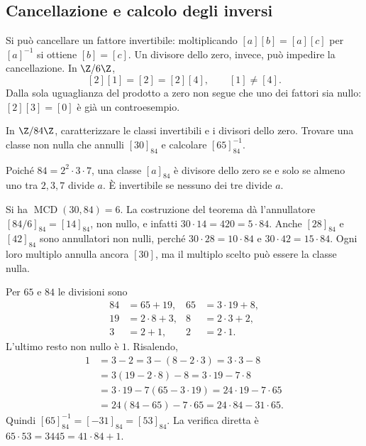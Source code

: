 \subsection{Cancellazione e calcolo degli inversi}
\begin{osservazione}
Si può cancellare un fattore invertibile: moltiplicando $[a][b]=[a][c]$ per $[a]^{-1}$ si ottiene $[b]=[c]$. Un divisore dello zero, invece, può impedire la cancellazione. In $\Z/6\Z$,
\[
[2][1]=[2]=[2][4],\qquad [1]\ne[4].
\]
Dalla sola uguaglianza del prodotto a zero non segue che uno dei fattori sia nullo: $[2][3]=[0]$ è già un controesempio.
\end{osservazione}

\begin{esercizio}
In $\Z/84\Z$, caratterizzare le classi invertibili e i divisori dello zero. Trovare una classe non nulla che annulli $[30]_{84}$ e calcolare $[65]_{84}^{-1}$.
\end{esercizio}
\begin{svolgimento}
Poiché $84=2^2\cdot3\cdot7$, una classe $[a]_{84}$ è divisore dello zero se e solo se almeno uno tra $2,3,7$ divide $a$. È invertibile se nessuno dei tre divide $a$.

Si ha $\operatorname{MCD}(30,84)=6$. La costruzione del teorema dà l'annullatore $[84/6]_{84}=[14]_{84}$, non nullo, e infatti $30\cdot14=420=5\cdot84$. Anche $[28]_{84}$ e $[42]_{84}$ sono annullatori non nulli, perché $30\cdot28=10\cdot84$ e $30\cdot42=15\cdot84$. Ogni loro multiplo annulla ancora $[30]$, ma il multiplo scelto può essere la classe nulla.

Per $65$ e $84$ le divisioni sono
\[
\begin{aligned}
84&=65+19,&65&=3\cdot19+8,\\
19&=2\cdot8+3,&8&=2\cdot3+2,\\
3&=2+1,&2&=2\cdot1.
\end{aligned}
\]
L'ultimo resto non nullo è $1$. Risalendo,
\[
\begin{aligned}
1&=3-2=3-(8-2\cdot3)=3\cdot3-8\\
 &=3(19-2\cdot8)-8=3\cdot19-7\cdot8\\
 &=3\cdot19-7(65-3\cdot19)=24\cdot19-7\cdot65\\
 &=24(84-65)-7\cdot65=24\cdot84-31\cdot65.
\end{aligned}
\]
Quindi $[65]_{84}^{-1}=[-31]_{84}=[53]_{84}$. La verifica diretta è $65\cdot53=3445=41\cdot84+1$.
\end{svolgimento}

